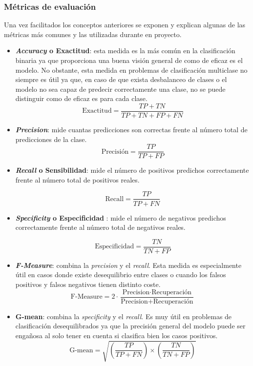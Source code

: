 \subsubsection{Métricas de evaluación}
Una vez facilitados los conceptos anteriores se exponen y explican algunas de las métricas más comunes y las utilizadas durante en proyecto.
\begin{itemize}

\item \textbf{\textit{Accuracy} o Exactitud}: esta medida es la más común en la clasificación binaria ya que proporciona una buena visión general de como de eficaz es el modelo. No obstante, esta medida 
en problemas de clasificación multiclase no siempre es útil ya que, en caso de que exista desbalanceo de clases o el modelo no sea capaz de predecir correctamente una clase, no se puede distinguir como de eficaz es para cada clase.
\begin{equation}
\text{Exactitud} = \frac{TP + TN}{TP + TN + FP + FN}
\end{equation}
\item \textbf{\textit{Precision}}: mide cuantas predicciones son correctas frente al número total de predicciones de la clase.
\begin{equation}
\text{Precisión} = \frac{TP}{TP + FP}
\end{equation}
\item \textbf{\textit{Recall} o Sensibilidad}: mide el número de positivos predichos correctamente  frente al número total de positivos reales.

\begin{equation}
\text{Recall} = \frac{TP}{TP + FN}
\end{equation}
\item \textbf{\textit{Specificity} o Especificidad }: mide el número de negativos predichos correctamente  frente al número total de negativos reales.

\begin{equation}
\text{Especificidad} = \frac{TN}{TN + FP}
\end{equation}
\item \textbf{\textit{F-Measure}}: combina la \textit{precision} y el \textit{recall}. Esta medida es especialmente útil en casos donde existe desequilibrio entre clases o cuando los falsos positivos y falsos negativos tienen distinto coste.
\begin{equation}
\text{F-Measure} = 2 \cdot \frac{\text{Precision} \cdot \text{Recuperación}}{\text{Precision} + \text{Recuperación}}
\end{equation}

\item \textbf{G-mean}: combina la \textit{specificity} y el \textit{recall}. Es muy útil en problemas de clasificación desequilibrados ya que la precisión general del modelo puede ser engañosa al solo tener en cuenta si clasifica bien los casos positivos.
\begin{equation}
\text{G-mean} = \sqrt{\left( \frac{TP}{TP + FN} \right) \times \left( \frac{TN}{TN + FP} \right)}
\end{equation}

\end{itemize} 

